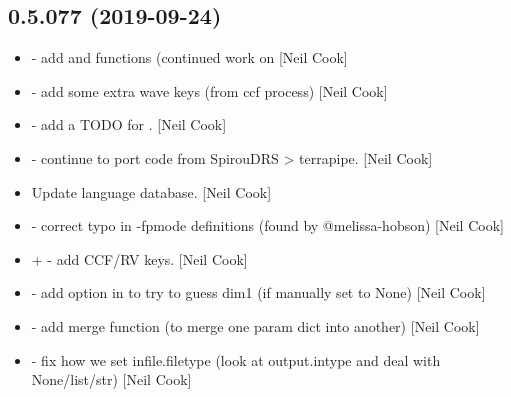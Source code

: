 \documentclass[a4paper,10pt,english]{report}
\begin{document}
\subsection{0.5.077 (2019-09-24)}
\label{\detokenize{misc/changelog:id66}}\begin{itemize}
\item {} 
 - add  and
 functions (continued work on  {[}Neil
Cook{]}

\item {} 
 - add some extra wave keys (from ccf process)
{[}Neil Cook{]}

\item {} 
 - add a TODO for . {[}Neil Cook{]}

\item {} 
 - continue to port code from SpirouDRS
\textendash{}\textgreater{} terrapipe. {[}Neil Cook{]}

\item {} 
Update language database. {[}Neil Cook{]}

\item {} 
 - correct typo in
 -fpmode definitions (found by @melissa-hobson) {[}Neil Cook{]}

\item {} 
 +  - add
CCF/RV keys. {[}Neil Cook{]}

\item {} 
 - add option in  to try
to guess dim1 (if manually set to None) {[}Neil Cook{]}

\item {} 
 - add merge function (to merge one
param dict into another) {[}Neil Cook{]}

\item {} 
 - fix how we set infile.filetype
(look at output.intype and deal with None/list/str) {[}Neil Cook{]}

\end{itemize}
\end{document}

